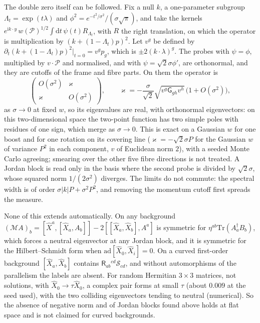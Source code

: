 The double zero itself can be followed. Fix a null \(k\), a one-parameter subgroup \(\Lambda_t=\exp(t\lambda)\) and \(\phi^2=e^{-t^2/\sigma^2}/(\sigma\sqrt\pi)\), and take the kernels \(e^{\mathrm ik\cdot y}\,w(\mathcal P)^{1/2}\int\mathrm dt\,\psi(t)R_{\Lambda_t}\), with \(R\) the right translation, on which the operator is multiplication by \((k+(1-\Lambda_t)p)^2\). Let \(v^g\) be defined by \(\partial_t(k+(1-\Lambda_t)p)^2|_{t=0}=v^gp_g\), which is \(\pm2(k\cdot\lambda)^g\). The probes with \(\psi=\phi\), multiplied by \(v\cdot\mathcal P\) and normalised, and with \(\psi=\sqrt2\sigma\phi'\), are orthonormal, and they are cutoffs of the frame and fibre parts. On them the operator is
\[
\begin{pmatrix}O(\sigma^2)&\varkappa\\\varkappa&O(\sigma^2)\end{pmatrix},\qquad
\varkappa=-\frac{\sigma}{\sqrt2}\sqrt{v^g\mathsf G_{gh}v^h}\,\bigl(1+O(\sigma^2)\bigr),
\]
as \(\sigma\to0\) at fixed \(w\), so its eigenvalues are real, with orthonormal eigenvectors: on this two-dimensional space the two-point function has two simple poles with residues of one sign, which merge as \(\sigma\to0\). This is exact on a Gaussian \(w\) for one boost and for one rotation on its covering line (\(\varkappa=-\sqrt2\sigma P\) for the Gaussian \(w\) of variance \(P^2\) in each component, \(v\) of Euclidean norm \(2\)), with a seeded Monte Carlo agreeing; smearing over the other five fibre directions is not treated. A Jordan block is read only in the basis where the second probe is divided by \(\sqrt2\sigma\), whose squared norm \(1/(2\sigma^2)\) diverges. The limits do not commute: the spectral width is of order \(\sigma|k|P+\sigma^2P^2\), and removing the momentum cutoff first spreads the measure.

None of this extends automatically. On any background \((\mathcal MA)_b=[\hat X^a,[\hat X_a,A_b]]-2[[\hat X_a,\hat X_b],A^a]\) is symmetric for \(\eta^{ab}\mathrm{Tr}(A_a^\dagger B_b)\), which forces a neutral eigenvector at any Jordan block, and it is symmetric for the Hilbert--Schmidt form when \(\mathrm{ad}[\hat X_0,\hat X_i]=0\). On a curved first-order background \([\hat X_a,\hat X_b]\) contains \(\mathsf R_{ab}{}^{cd}\mathcal S_{cd}\), and without automorphisms of the parallelism the labels are absent. For random Hermitian \(3\times3\) matrices, not solutions, with \(\hat X_0\to\tau\hat X_0\), a complex pair forms at small \(\tau\) (about \(0.009\) at the seed used), with the two colliding eigenvectors tending to neutral (numerical). So the absence of negative norm and of Jordan blocks found above holds at flat space and is not claimed for curved backgrounds.

